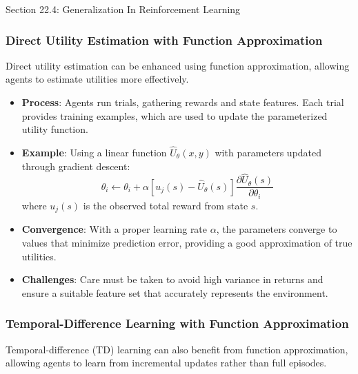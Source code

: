 \begin{notes}{Section 22.4: Generalization In Reinforcement Learning}
\begin{highlight}
    \end{highlight}
    
    \subsubsection*{Direct Utility Estimation with Function Approximation}
    
    Direct utility estimation can be enhanced using function approximation, allowing agents to estimate utilities more effectively.
    
    \begin{highlight}
    
        \begin{itemize}
            \item \textbf{Process}: Agents run trials, gathering rewards and state features. Each trial provides training examples, which are used to update the parameterized utility function.
            \item \textbf{Example}: Using a linear function $\hat{U}_\theta(x, y)$ with parameters updated through gradient descent:
            \[
            \theta_i \leftarrow \theta_i + \alpha [u_j(s) - \hat{U}_\theta(s)] \frac{\partial \hat{U}_\theta(s)}{\partial \theta_i}
            \]
            where $u_j(s)$ is the observed total reward from state $s$.
            \item \textbf{Convergence}: With a proper learning rate $\alpha$, the parameters converge to values that minimize prediction error, providing a good approximation of true utilities.
            \item \textbf{Challenges}: Care must be taken to avoid high variance in returns and ensure a suitable feature set that accurately represents the environment.
        \end{itemize}
    
    \end{highlight}
    
    \subsubsection*{Temporal-Difference Learning with Function Approximation}
    
    Temporal-difference (TD) learning can also benefit from function approximation, allowing agents to learn from incremental updates rather than full episodes.
    
    \begin{highlight}
    

\end{highlight}
\end{notes}
